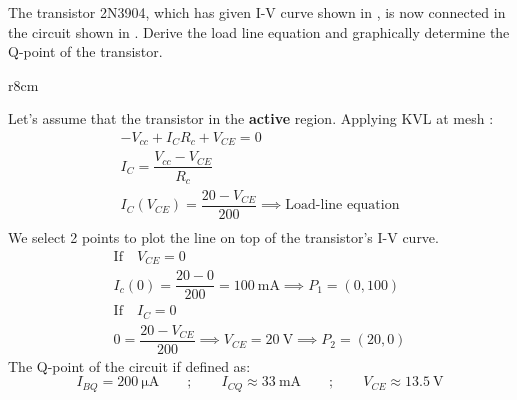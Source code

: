 \documentclass[10pt,a4paper]{memoir}
\begin{document}
\newpage
\begin{question}
  The transistor 2N3904, which has given I-V curve shown in , is now connected in the circuit shown in . Derive the load line equation and graphically determine the Q-point of the transistor.
  \begin{figure}[!h]
    \centering
     \qquad\qquad
    \subfloat[]{\texttt{[image: t09-2b]}\label{fig:t09-2b}}
    \caption{}
  \end{figure}
\end{question}
\begin{solution}
  \setlength\figwidth{80mm}
  \begin{wrapfigure}{r}{8cm}
    \centering
  \end{wrapfigure}
  Let's assume that the transistor in the \textbf{active} region.
  \newline
  Applying KVL at mesh :
  \begin{gather*}
    -V_{cc} + I_{C}R_{c} + V_{CE} = 0 \\
    I_{C} = \dfrac{V_{cc} - V_{CE}}{R_{c}} \\
    I_{C}\left(V_{CE}\right) = \dfrac{20 - V_{CE}}{200}\implies \mbox{Load-line equation} \\
  \end{gather*}
  We select 2 points to plot the line on top of the transistor's I-V curve.
  \begin{gather*}
    \mbox{If}\quad V_{CE}=0 \\
    I_{c}(0) = \dfrac{20 - 0}{200} = \SI{100}{\milli\ampere} \implies P_1 = \left( 0, 100\right) \\
    \mbox{If}\quad I_{C}=0 \\
    0 = \dfrac{20 - V_{CE}}{200} \implies V_{CE} = \SI{20}{\volt} \implies P_2 = \left( 20, 0\right)
  \end{gather*}
  \newline
  The Q-point of the circuit if defined as:
  \begin{equation*}
    I_{BQ} = \SI{200}{\micro\ampere} \qquad;\qquad I_{CQ}\approx \SI{33}{\milli\ampere} \qquad;\qquad V_{CE} \approx \SI{13.5}{\volt}
  \end{equation*}
\end{solution}
\end{document}
